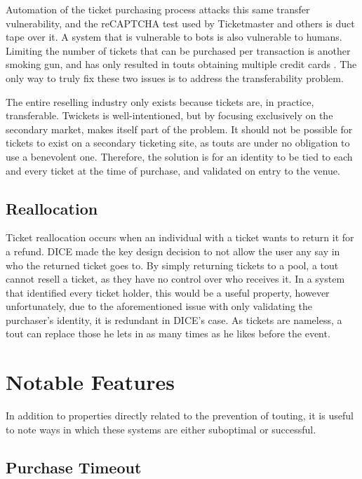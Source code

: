 \documentclass[12pt,a4paper]{bhamdissertation}
\begin{document}
Automation of the ticket purchasing process attacks this same transfer vulnerability, and the reCAPTCHA \cite{T167} test used by Ticketmaster and others is duct tape over it. A system that is vulnerable to bots is also vulnerable to humans. Limiting the number of tickets that can be purchased per transaction is another smoking gun, and has only resulted in touts obtaining multiple credit cards \cite{DJ16}. The only way to truly fix these two issues is to address the transferability problem.

The entire reselling industry only exists because tickets are, in practice, transferable. Twickets \cite{Tw161} is well-intentioned, but by focusing exclusively on the secondary market, makes itself part of the problem. It should not be possible for tickets to exist on a secondary ticketing site, as touts are under no obligation to use a benevolent one. Therefore, the solution is for an identity to be tied to each and every ticket at the time of purchase, and validated on entry to the venue.

\subsection{Reallocation}

Ticket reallocation occurs when an individual with a ticket wants to return it for a refund. DICE made the key design decision to not allow the user any say in who the returned ticket goes to. By simply returning tickets to a pool, a tout cannot resell a ticket, as they have no control over who receives it. In a system that identified every ticket holder, this would be a useful property, however unfortunately, due to the aforementioned issue with only validating the purchaser's identity, it is redundant in DICE's case. As tickets are nameless, a tout can replace those he lets in as many times as he likes before the event. 

\section{Notable Features}

In addition to properties directly related to the prevention of touting, it is useful to note ways in which these systems are either suboptimal or successful.

\subsection{Purchase Timeout}
\end{document}
